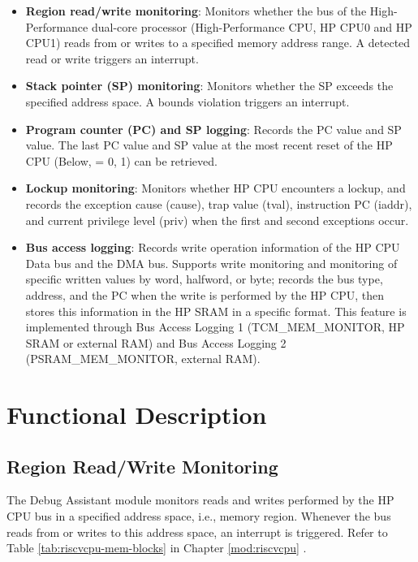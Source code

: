 \documentclass[main\_\_EN.tex]{subfiles}
\begin{document}
\begin{itemize}
    \item \textbf{Region read/write monitoring}: Monitors whether the bus of the High-Performance dual-core processor (High-Performance CPU, HP CPU0 and HP CPU1) reads from or writes to a specified memory address range. A detected read or write triggers an interrupt.
    \item \textbf{Stack pointer (SP) monitoring}: Monitors whether the SP exceeds the specified address space. A bounds violation triggers an interrupt.
    \item \textbf{Program counter (PC) and SP logging}: Records the PC value and SP value. The last PC value and SP value at the most recent reset of the HP CPU (Below,  = 0, 1) can be retrieved.
    \item \textbf{Lockup monitoring}: Monitors whether HP CPU encounters a lockup, and records the exception cause (cause), trap value (tval), instruction PC (iaddr), and current privilege level (priv) when the first and second exceptions occur.
    \item \textbf{Bus access logging}: Records write operation information of the HP CPU Data bus and the DMA bus. Supports write monitoring and monitoring of specific written values by word, halfword, or byte; records the bus type, address, and the PC when the write is performed by the HP CPU, then stores this information in the HP SRAM in a specific format. This feature is implemented through Bus Access Logging 1 (TCM\_MEM\_MONITOR, HP SRAM or external RAM) and Bus Access Logging 2 (PSRAM\_MEM\_MONITOR, external RAM).
\end{itemize}

\section{Functional Description}
\label{sec:dbgassist-func-descr}

\subsection{Region Read/Write Monitoring}

The Debug Assistant module monitors reads and writes performed by the HP CPU bus in a specified address space, i.e., memory region. Whenever the bus reads from or writes to this address space, an interrupt is triggered. Refer to Table \ref{tab:riscvcpu-mem-blocks} in Chapter \ref{mod:riscvcpu} \textit{}.
\end{document}
